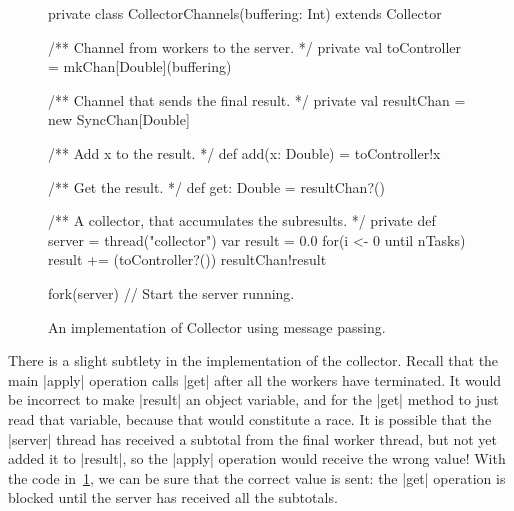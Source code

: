 \begin{figure}
\begin{scala}
  private class CollectorChannels(buffering: Int) extends Collector{
    /** Channel from workers to the server. */
    private val toController = mkChan[Double](buffering)

    /** Channel that sends the final result. */
    private val resultChan = new SyncChan[Double]

    /** Add x to the result. */
    def add(x: Double) = toController!x

    /** Get the result. */
    def get: Double = resultChan?()
    
    /** A collector, that accumulates the subresults. */
    private def server = thread("collector"){
      var result = 0.0
      for(i <- 0 until nTasks) result += (toController?())
      resultChan!result
    }

    fork(server)    // Start the server running.
  }
\end{scala}
\caption{An implementation of {\scalashape Collector} using message passing.}
\label{fig:collector}
\end{figure}



There is a slight subtlety in the implementation of the collector.  Recall
that the main |apply| operation calls |get| after all the workers have
terminated.  It would be incorrect to make |result| an object variable, and
for the |get| method to just read that variable, because that would constitute
a race.  It is possible that the |server| thread has received a subtotal
from the final worker thread, but not yet added it to |result|, so the |apply|
operation would receive the wrong value!  With the code
in~\ref{fig:collector}, we can be sure that the correct value is sent: the
|get| operation is blocked until the server has received all the subtotals.

